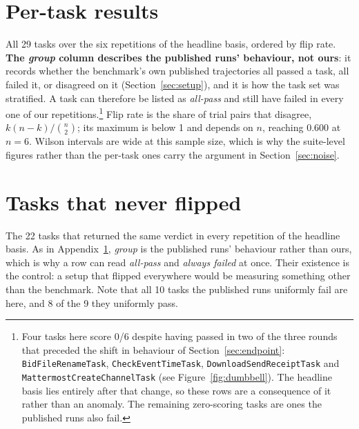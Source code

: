 \section{Per-task results}
\label{app:pertask}
All 29 tasks over the six repetitions of the headline basis, ordered by flip
rate. \textbf{The \emph{group} column describes the published runs' behaviour,
not ours}: it records whether the benchmark's own published trajectories all
passed a task, all failed it, or disagreed on it (Section~\ref{sec:setup}), and
it is how the task set was stratified. A task can therefore be listed as
\emph{all-pass} and still have failed in every one of our repetitions.\footnote{%
Four tasks here score 0/6 despite having passed in two of the three rounds that
preceded the shift in behaviour of Section~\ref{sec:endpoint}:
\texttt{BidFileRenameTask}, \texttt{CheckEventTimeTask},
\texttt{DownloadSendReceiptTask} and \texttt{MattermostCreateChannelTask} (see
Figure~\ref{fig:dumbbell}). The headline basis lies entirely after that change,
so these rows are a consequence of it rather than an anomaly. The remaining
zero-scoring tasks are ones the published runs also fail.} Flip rate is the share of trial pairs that disagree,
$k(n-k)/\binom{n}{2}$; its maximum is below 1 and depends on $n$, reaching
0.600 at $n=6$. Wilson intervals are wide at this sample size, which is why the
suite-level figures rather than the per-task ones carry the argument in
Section~\ref{sec:noise}.

\begin{center}\scriptsize

\end{center}

\section{Tasks that never flipped}
\label{app:stable}
The 22 tasks that returned the same verdict in every repetition of the headline
basis. As in Appendix~\ref{app:pertask}, \emph{group} is the published runs'
behaviour rather than ours, which is why a row can read \emph{all-pass} and
\emph{always failed} at once. Their existence is the control: a setup that flipped everywhere would be
measuring something other than the benchmark. Note that all 10 tasks the
published runs uniformly fail are here, and 8 of the 9 they uniformly pass.

\begin{center}\scriptsize

\end{center}

